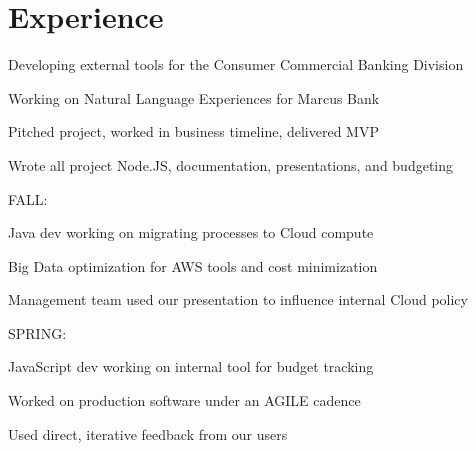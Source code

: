 \documentclass[]{deedy-resume-openfont}
\begin{document}
\begin{minipage}[t]{0.33\textwidth}
\sectionsep









%
%

\end{minipage}
\hfill
\begin{minipage}[t]{0.66\textwidth}


\section{Experience}

\vspace{\topsep} %
\begin{tightemize}
\item Developing external tools for the Consumer Commercial Banking Division
\item Working on Natural Language Experiences for Marcus Bank
\item Pitched project, worked in business timeline, delivered MVP
\item Wrote all project Node.JS, documentation, presentations, and budgeting
\end{tightemize}
\sectionsep

FALL:
\begin{tightemize}
\item Java dev working on migrating processes to Cloud compute
\item Big Data optimization for AWS tools and cost minimization
\item Management team used our presentation to influence internal Cloud policy
\end{tightemize}
SPRING:
\begin{tightemize}
\item JavaScript dev working on internal tool for budget tracking
\item Worked on production software under an AGILE cadence
\item Used direct, iterative feedback from our users
\end{tightemize}
\sectionsep


\end{minipage}
\end{document}
